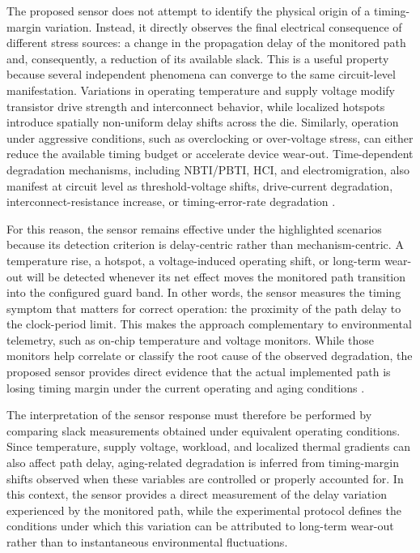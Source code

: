 \documentclass[a4paper,10pt,twoside,twocolumn,final]{JICS_LaTexGuidelines}
\begin{document}
The proposed sensor does not attempt to identify the physical origin of a timing-margin variation. Instead, it directly observes the final electrical consequence of different stress sources: a change in the propagation delay of the monitored path and, consequently, a reduction of its available slack. This is a useful property because several independent phenomena can converge to the same circuit-level manifestation. Variations in operating temperature and supply voltage modify transistor drive strength and interconnect behavior, while localized hotspots introduce spatially non-uniform delay shifts across the die. Similarly, operation under aggressive conditions, such as overclocking or over-voltage stress, can either reduce the available timing budget or accelerate device wear-out. Time-dependent degradation mechanisms, including NBTI/PBTI, HCI, and electromigration, also manifest at circuit level as threshold-voltage shifts, drive-current degradation, interconnect-resistance increase, or timing-error-rate degradation \cite{Lanzieri2024AgeingSurvey,Pande2022EMSignalInterconnects,Huang2021RealTimeAgingPrediction}.

For this reason, the sensor remains effective under the highlighted scenarios because its detection criterion is delay-centric rather than mechanism-centric. A temperature rise, a hotspot, a voltage-induced operating shift, or long-term wear-out will be detected whenever its net effect moves the monitored path transition into the configured guard band. In other words, the sensor measures the timing symptom that matters for correct operation: the proximity of the path delay to the clock-period limit. This makes the approach complementary to environmental telemetry, such as on-chip temperature and voltage monitors. While those monitors help correlate or classify the root cause of the observed degradation, the proposed sensor provides direct evidence that the actual implemented path is losing timing margin under the current operating and aging conditions \cite{AMD_DS931_ArtixUltraScalePlus_2026,Li2022FPGAAgingPrediction,Lanzieri2024AgeingSurvey}.

The interpretation of the sensor response must therefore be performed by comparing slack measurements obtained under equivalent operating conditions. Since temperature, supply voltage, workload, and localized thermal gradients can also affect path delay, aging-related degradation is inferred from timing-margin shifts observed when these variables are controlled or properly accounted for. In this context, the sensor provides a direct measurement of the delay variation experienced by the monitored path, while the experimental protocol defines the conditions under which this variation can be attributed to long-term wear-out rather than to instantaneous environmental fluctuations.
\end{document}
